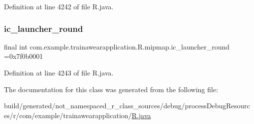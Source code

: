 Definition at line 4242 of file R.\+java.

\mbox{\label{classcom_1_1example_1_1trainawearapplication_1_1_r_1_1mipmap_a9fa53e4ffcc464ff3e40e922985284cc}} 
\subsubsection{\texorpdfstring{ic\_launcher\_round}{ic\_launcher\_round}}
{\footnotesize\ttfamily final int com.\+example.\+trainawearapplication.\+R.\+mipmap.\+ic\+\_\+launcher\+\_\+round =0x7f0b0001\hspace{0.3cm}{\ttfamily [static]}}



Definition at line 4243 of file R.\+java.



The documentation for this class was generated from the following file\+:\begin{DoxyCompactItemize}
\item 
build/generated/not\+\_\+namespaced\+\_\+r\+\_\+class\+\_\+sources/debug/process\+Debug\+Resources/r/com/example/trainawearapplication/\mbox{\hyperlink{com_2example_2trainawearapplication_2_r_8java}{R.\+java}}\end{DoxyCompactItemize}
